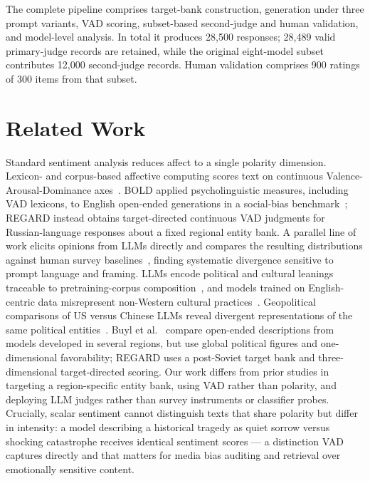 \documentclass[runningheads,a4paper]{llncs}
\begin{document}
The complete pipeline comprises target-bank construction, generation under
three prompt variants, VAD scoring, subset-based second-judge and human
validation, and model-level analysis. In total it produces 28,500 responses;
28,489 valid primary-judge records are retained, while the original eight-model
subset contributes 12,000 second-judge records. Human validation comprises
900 ratings of 300 items from that subset.

\section{Related Work}
\label{sec:relwork}

Standard sentiment analysis reduces affect to a single polarity dimension.
Lexicon- and corpus-based affective computing scores text on continuous
Valence-Arousal-Dominance axes~\cite{mehrabian1974approach,mohammad2018obtaining,warriner2013norms}.
BOLD applied psycholinguistic measures, including VAD lexicons, to
English open-ended generations in a social-bias benchmark~\cite{dhamala2021bold};
REGARD instead obtains target-directed continuous VAD judgments for
Russian-language responses about a fixed regional entity bank.
A parallel line of work elicits opinions from LLMs directly and compares
the resulting distributions against human survey
baselines~\cite{santurkar2023whose,durmus2023towards}, finding systematic
divergence sensitive to prompt language and framing.
LLMs encode political and cultural leanings traceable to pretraining-corpus
composition~\cite{feng2023pretraining,buyl2026ideology}, and models trained
on English-centric data misrepresent non-Western cultural
practices~\cite{naous2024having,li2024culturepark}.
Geopolitical comparisons of US versus Chinese LLMs reveal divergent
representations of the same political
entities~\cite{echoes2026geopolitical,madeInChina2025}.
Buyl et al.~\cite{buyl2026ideology} compare open-ended descriptions from
models developed in several regions, but use global political figures and
one-dimensional favorability; REGARD uses a post-Soviet target bank and
three-dimensional target-directed scoring.
Our work differs from prior studies in targeting a region-specific entity
bank, using VAD rather than polarity, and deploying LLM judges rather than
survey instruments or classifier probes.
Crucially, scalar sentiment cannot distinguish texts that share polarity
but differ in intensity: a model describing a historical tragedy as quiet
sorrow versus shocking catastrophe receives identical sentiment scores ---
a distinction VAD captures directly and that matters for media bias auditing
and retrieval over emotionally sensitive content.
\end{document}
